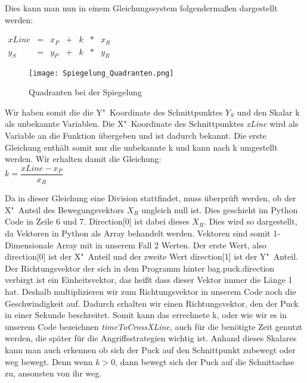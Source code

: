 Dies kann man nun in einem Gleichungssystem folgendermaßen dargestellt werden: 

$
\begin{array}{ccccccc}
xLine & = & x_P & + & k & * & x_R \\
y_S & = & y_P & + & k & * & y_R
\end{array}
$ 

\begin{wrapfigure}{R}{0pt}
	\vspace{-15pt}
	\texttt{[image: Spiegelung\_Quadranten.png]}
	\vspace{-15pt}
	\caption{Quadranten bei der Spiegelung}
	\vspace{-15pt}
	\label{img:Quadranten}
\end{wrapfigure}

Wir haben somit die die Y"~Koordinate des Schnittpunktes $Y_S$ und den Skalar k als unbekannte Variablen. Die X"~Koordinate des Schnittpunktes \textit{xLine} wird als Variable an die Funktion übergeben und ist dadurch bekannt. Die erste Gleichung enthält somit nur die unbekannte k und kann nach k umgestellt werden. Wir erhalten damit die Gleichung: \\
$k = \dfrac{xLine - x_P}{x_R}$

Da in dieser Gleichung eine Division stattfindet, muss überprüft werden, ob der X"~Anteil des Bewegungsvektors $X_R$ ungleich null ist. Dies geschieht im Python Code in Zeile 6 und 7. Direction[0] ist dabei dieses $X_R$. Dies wird so dargestellt, da Vektoren in Python als Array behandelt werden. Vektoren sind somit 1-Dimensionale Array mit in unserem Fall 2 Werten. Der erste Wert, also direction[0] ist der X"~Anteil und der zweite Wert direction[1] ist der Y"~Anteil. Der Richtungsvektor der sich in dem Programm hinter bag.puck.direction verbirgt ist ein Einheitsvektor, das heißt dass dieser Vektor immer die Länge 1 hat. Deshalb multiplizieren wir zum Richtungsvektor in unserem Code noch die Geschwindigkeit auf. Dadurch erhalten wir einen Richtungsvektor, den der Puck in einer Sekunde beschreitet. Somit kann das errechnete k, oder wie wir es in unserem Code bezeichnen \textit{timeToCrossXLine}, auch für die benötigte Zeit genutzt werden, die später für die Angriffsstrategien wichtig ist. Anhand dieses Skalares kann man auch erkennen ob sich der Puck auf den Schnittpunkt zubewegt oder weg bewegt. Denn wenn $k>0$, dann bewegt sich der Puck auf die Schnittachse zu, ansonsten von ihr weg. 

